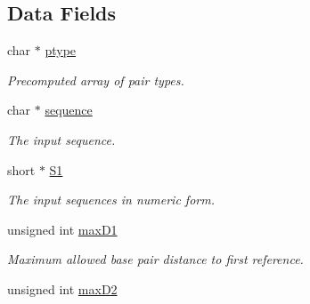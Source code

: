 \subsection*{Data Fields}
\begin{DoxyCompactItemize}
\item 
\hypertarget{structTwoDpfold__vars_a67f37b8901b8d0a049c216d4c6241b07}{char $\ast$ \hyperlink{structTwoDpfold__vars_a67f37b8901b8d0a049c216d4c6241b07}{ptype}}\label{structTwoDpfold__vars_a67f37b8901b8d0a049c216d4c6241b07}

\begin{DoxyCompactList}\small\item\em Precomputed array of pair types. \end{DoxyCompactList}\item 
\hypertarget{structTwoDpfold__vars_a32c15a1e31856588259556c9020f32c6}{char $\ast$ \hyperlink{structTwoDpfold__vars_a32c15a1e31856588259556c9020f32c6}{sequence}}\label{structTwoDpfold__vars_a32c15a1e31856588259556c9020f32c6}

\begin{DoxyCompactList}\small\item\em The input sequence. \end{DoxyCompactList}\item 
\hypertarget{structTwoDpfold__vars_a240311ae1e8e121441651d6101e187ac}{short $\ast$ \hyperlink{structTwoDpfold__vars_a240311ae1e8e121441651d6101e187ac}{S1}}\label{structTwoDpfold__vars_a240311ae1e8e121441651d6101e187ac}

\begin{DoxyCompactList}\small\item\em The input sequences in numeric form. \end{DoxyCompactList}\item 
\hypertarget{structTwoDpfold__vars_a7292b6cbc1ee5bacf55e842f316c4bef}{unsigned int \hyperlink{structTwoDpfold__vars_a7292b6cbc1ee5bacf55e842f316c4bef}{max\-D1}}\label{structTwoDpfold__vars_a7292b6cbc1ee5bacf55e842f316c4bef}

\begin{DoxyCompactList}\small\item\em Maximum allowed base pair distance to first reference. \end{DoxyCompactList}\item 
\hypertarget{structTwoDpfold__vars_a8900622d91454d2d037242e290e42834}{unsigned int \hyperlink{structTwoDpfold__vars_a8900622d91454d2d037242e290e42834}{max\-D2}}\label{structTwoDpfold__vars_a8900622d91454d2d037242e290e42834}


\end{DoxyCompactItemize}
